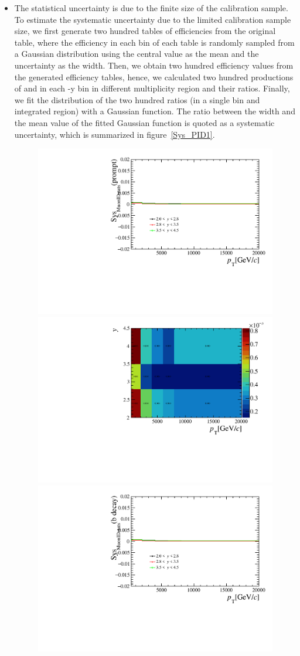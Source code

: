 \begin{itemize}
\item The statistical uncertainty is due to the finite size of the calibration sample.
To estimate the systematic uncertainty due to the limited calibration sample size, we first generate two hundred tables of efficiencies from the original table, where the efficiency in each bin of each table is randomly sampled from a Gaussian distribution using the central value as the mean and the uncertainty as the width. 
Then, we obtain two hundred efficiency values from the generated efficiency tables, hence, we calculated two hundred productions of \jpsi and \psitwos in each \pt-y bin in different multiplicity region and their ratios.
Finally, we fit the distribution of the two hundred ratios (in a single bin and integrated region) with a Gaussian function. 
The ratio between the width and the mean value of the fitted Gaussian function is quoted as a systematic uncertainty, which is summarized in figure~\ref{Sys_PID1}.
\begin{figure}[!tbp]
    \begin{center}
      \includegraphics[width=0.49\linewidth]{pdf/SysPID/n1Errp_point.pdf}
      \includegraphics[width=0.49\linewidth]{pdf/SysPID/n1Errp.pdf}
      \vspace*{-0.5cm}
      \includegraphics[width=0.49\linewidth]{pdf/SysPID/n1Errb_point.pdf}

\end{center}
\end{figure}
\end{itemize}
